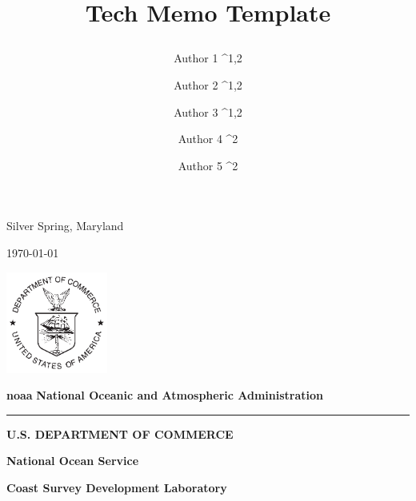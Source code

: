 \documentclass[12pt,english]{article}
\begin{document}
\date{\vspace{-5ex}}
\title{\begin{flushleft}\Large{\textbf{Tech Memo Template}}\end{flushleft}}

\maketitle

\author{Author 1 ^{1,2} \and Author 2 ^{1,2} \and Author 3 ^{1,2} \and Author 4 ^2 \and Author 5 ^2}

\vfill{}

\large{Silver Spring, Maryland}

\large{\today}

\vfill{}

\includegraphics[width=0.25\textwidth]{images/usdoc_logo}

\vfill{}

\textbf{\Huge{noaa}} \textbf{National Oceanic and Atmospheric Administration}

\rule[0.5ex]{1\columnwidth}{2pt}

\textbf{U.S. DEPARTMENT OF COMMERCE}

\textbf{National Ocean Service}

\textbf{Coast Survey Development Laboratory}

\thispagestyle{empty}

\newpage{}

\vspace*{\fill}
\end{document}
